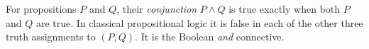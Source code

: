 
For propositions $P$ and $Q$, their \emph{conjunction} $P\land Q$ is true exactly when both $P$ and $Q$ are true. In classical propositional logic it is false in each of the other three truth assignments to $(P,Q)$. It is the Boolean \emph{and} connective.
